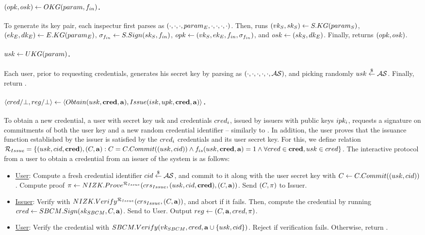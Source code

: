 \paragraph{$(opk,osk) \gets OKG(param,f_{in})$.} %
To generate its key pair, each inspectur first parses \parm as $(\cdot,\cdot,
\cdot,param_{E},\cdot,\cdot,\cdot,\cdot)$. Then, runs $(vk_{S},sk_{S}) \gets S.KG
(param_{S})$, $(ek_{E},dk_{E}) \gets E.KG(param_{E})$, $\sigma_{f_{in}} \gets S.Sign
(sk_{S},f_{in})$, $opk \gets (vk_{S},ek_{E},f_{in},\sigma_{f_{in}})$, and $osk \gets
(sk_{S},dk_{E})$. Finally, returns $(opk,osk)$.

\paragraph{$usk \gets UKG(param)$.} %
Each user, prior to requesting credentials, generates his secret key by parsing
\parm as $(\cdot,\cdot,\cdot,\cdot,\cdot,\mathcal{AS})$, and picking randomly
$usk \stackrel{\$}{\gets} \mathcal{AS}$. Finally, return \usk.

\paragraph{$\langle cred/\bot,reg/\bot \rangle \gets
  \langle Obtain(usk,\mathbf{cred},\mathbf{a}),Issue(isk,upk,\mathbf{cred},\mathbf{a})\rangle$.} %
To obtain a new credential, a user with secret key usk and credentials $cred_i$,
issued by issuers with public keys $ipk_i$, requests a signature on commitments
of both the user key and a new random credential identifier -- similarly to
\GSAC. In addition, the user proves that the issuance function \fissue
established by the issuer is satisfied by the $cred_i$ credentials and its user
secret key. For this, we define relation $\mathcal{R}_{Issue} = \lbrace (usk,
cid,\mathbf{cred}), (C,\mathbf{a}): C = C.Commit((usk,cid)) \land
f_{is}(usk,\mathbf{cred},\mathbf{a}) = 1 \land \forall cred \in \mathbf{cred}, usk \in cred
\rbrace$.  The interactive protocol from a user to obtain a
credential from an issuer of the system is as follows:

\begin{itemize}
\item \uline{User}: Compute a fresh credential identifier $cid \stackrel{\$}{\gets}
  \mathcal{AS}$, and commit to it along with the user secret key with
  $C \gets C.Commit((usk,cid))$. Compute proof $\pi \gets
  NIZK.Prove^{\mathcal{R}_{Issue}}(crs_{Issue},(usk,cid,\mathbf{cred}),
  (C,\mathbf{a}))$. Send $(C,\pi)$ to Issuer.
\item \uline{Issuer}: Verify \NIZKproof with $NIZK.Verify^{\mathcal{R}_{Issue}}
  (crs_{Issue},(C,\mathbf{a}))$, and abort if it fails. Then, compute
  the credential by running $cred \gets SBCM.Sign(sk_{SBCM},C,\mathbf{a})$.
  Send \cred to User. Output $reg \gets (C,\mathbf{a},cred,\pi)$.
\item \uline{User}: Verify the credential with $SBCM.Verify(vk_{SBCM},cred,
  \mathbf{a} \cup \lbrace usk,cid \rbrace)$. Reject if verification fails.
  Otherwise, return \cred.
\end{itemize}

